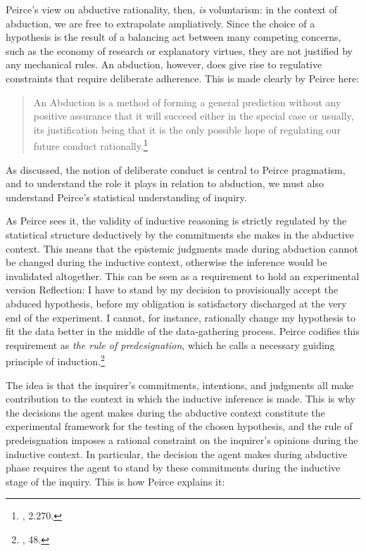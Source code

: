 Peirce's view on abductive rationality, then, \emph{is} voluntarism: in the context of abduction, we are free to extrapolate ampliatively.  
Since the choice of a hypothesis is the result of a balancing act between many competing concerns, such as the economy of research or explanatory virtues, they are not justified by any mechanical rules. An abduction, however, does give rise to regulative constraints that require deliberate adherence. This is made clearly by Peirce here:

\begin{quote}
An Abduction is a method of forming a general prediction without any
positive assurance that it will succeed either in the special case or
usually, its justification being that it is the only possible hope of
regulating our future conduct rationally.\footnote{\cite{CP}, 2.270.}
\end{quote}

As discussed, the notion of deliberate conduct is central to Peirce
pragmatism, and to understand the role it plays in relation to
abduction, we must also understand Peirce's statistical understanding of
inquiry.

As Peirce sees it, the validity of inductive reasoning is strictly
regulated by the statistical structure deductively by the commitments
she makes in the abductive context. This means that the epistemic
judgments made during abduction cannot be changed during the inductive
context, otherwise the inference would be invalidated altogether. This
can be seen as a requirement to hold an experimental version Reflection:
I have to stand by my decision to provisionally accept the abduced
hypothesis, before my obligation is satisfactory discharged at the very
end of the experiment. I cannot, for instance, rationally change my
hypothesis to fit the data better in the middle of the data-gathering
process. Peirce codifies this requirement as \emph{the rule of
predesignation}, which he calls a necessary guiding principle of
induction.\footnote{\cite{essentialpeirce2}, 48.}

The idea is that the inquirer's commitments, intentions, and judgments
all make contribution to the context in which the inductive inference is
made. This is why the decisions the agent makes during the abductive
context constitute the experimental framework for the testing of the
chosen hypothesis, and the rule of predeisgnation imposes a rational
constraint on the inquirer's opinions during the inductive context. In
particular, the decision the agent makes during abductive phase requires
the agent to stand by these commitments during the inductive stage of
the inquiry. This is how Peirce explains it:

